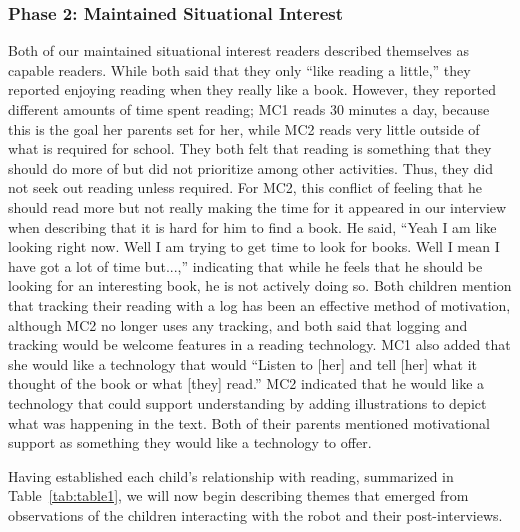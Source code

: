 \documentclass{sigchi}
\begin{document}
\subsubsection{Phase 2: Maintained Situational Interest}
Both of our maintained situational interest readers described themselves as capable readers. While both said that they only ``like reading a little,'' they reported enjoying reading when they really like a book. However, they reported different amounts of time spent reading; MC1 reads 30 minutes a day, because this is the goal her parents set for her, while MC2 reads very little outside of what is required for school. They both felt that reading is something that they should do more of but did not prioritize among other activities. Thus, they did not seek out reading unless required. For MC2, this conflict of feeling that he should read more but not really making the time for it appeared in our interview when describing that it is hard for him to find a book. He said, ``Yeah I am like looking right now. Well I am trying to get time to look for books. Well I mean I have got a lot of time but...,'' indicating that while he feels that he should be looking for an interesting book, he is not actively doing so. Both children mention that tracking their reading with a log has been an effective method of motivation, although MC2 no longer uses any tracking, and both said that logging and tracking would be welcome features in a reading technology. MC1 also added that she would like a technology that would ``Listen to [her] and tell [her] what it thought of the book or what [they] read.'' MC2 indicated that he would like a technology that could support understanding by adding illustrations to depict what was happening in the text. Both of their parents mentioned motivational support as something they would like a technology to offer.

Having established each child's relationship with reading, summarized in Table~\ref{tab:table1}, we will now begin describing themes that emerged from observations of the children interacting with the robot and their post-interviews.
\end{document}
